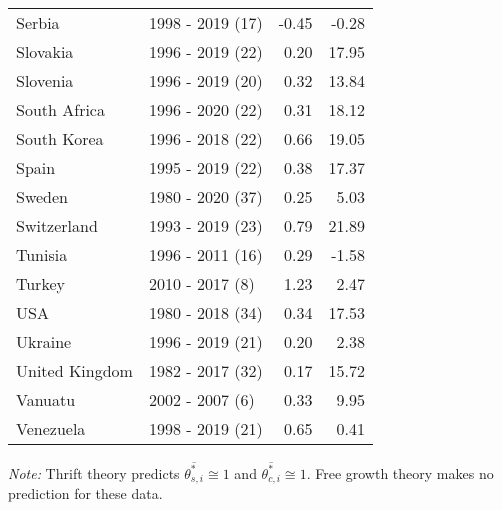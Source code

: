 \begin{table}[pos=h]
{{\begin{tabular}{llrr}
Serbia & 1998 - 2019 (17) & -0.45 & -0.28\\
Slovakia & 1996 - 2019 (22) & 0.20 & 17.95\\
\addlinespace
Slovenia & 1996 - 2019 (20) & 0.32 & 13.84\\
South Africa & 1996 - 2020 (22) & 0.31 & 18.12\\
South Korea & 1996 - 2018 (22) & 0.66 & 19.05\\
Spain & 1995 - 2019 (22) & 0.38 & 17.37\\
Sweden & 1980 - 2020 (37) & 0.25 & 5.03\\
\addlinespace
Switzerland & 1993 - 2019 (23) & 0.79 & 21.89\\
Tunisia & 1996 - 2011 (16) & 0.29 & -1.58\\
Turkey & 2010 - 2017 (8) & 1.23 & 2.47\\
USA & 1980 - 2018 (34) & 0.34 & 17.53\\
Ukraine & 1996 - 2019 (21) & 0.20 & 2.38\\
\addlinespace
United Kingdom & 1982 - 2017 (32) & 0.17 & 15.72\\
Vanuatu & 2002 - 2007 (6) & 0.33 & 9.95\\
Venezuela & 1998 - 2019 (21) & 0.65 & 0.41\\
\bottomrule \end{tabular}

}
}
\begin{flushleft}
\footnotesize \emph{Note:} Thrift theory predicts \(\overline{\theta^*_{s,i}} \cong 1\) and \(\overline{\theta^*_{c,i}} \cong 1\). Free growth theory  makes no prediction for these data.
\end{flushleft}
\end{table}